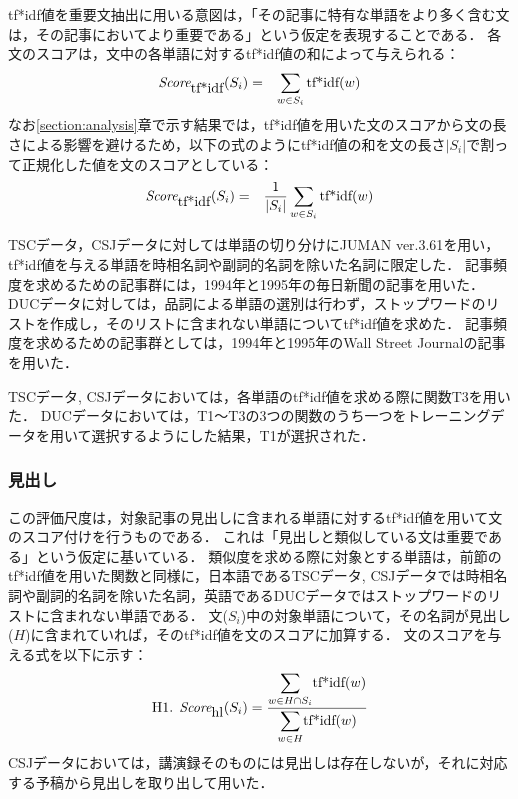tf*idf値を重要文抽出に用いる意図は，「その記事に特有な単語をより多く含む文は，その記事においてより重要である」という仮定を表現することである．
各文のスコアは，文中の各単語に対するtf*idf値の和によって与えられる：
\begin{eqnarray*}
\mbox{\it Score}_{\mbox{tf*idf}}(S_i) & = & \sum_{w \in S_i} \mbox{tf*idf}(w)
\end{eqnarray*}
なお\ref{section:analysis}章で示す結果では，tf*idf値を用いた文のスコアから文の長さによる影響を避けるため，以下の式のようにtf*idf値の和を文の長さ\(\vert S_i \vert\)で割って正規化した値を文のスコアとしている：
\begin{eqnarray*}
\mbox{\it Score}_{\mbox{tf*idf}}(S_i) & = & \frac{1}{\vert S_i \vert}\sum_{w \in S_i} \mbox{tf*idf}(w)
\end{eqnarray*}

TSCデータ，CSJデータに対しては単語の切り分けにJUMAN ver.3.61\cite{juman361}を用い，tf*idf値を与える単語を時相名詞や副詞的名詞を除いた名詞に限定した．
記事頻度を求めるための記事群には，1994年と1995年の毎日新聞の記事を用いた．
DUCデータに対しては，品詞による単語の選別は行わず，ストップワードのリストを作成し，そのリストに含まれない単語についてtf*idf値を求めた．
記事頻度を求めるための記事群としては，1994年と1995年のWall Street Journalの記事を用いた．

TSCデータ, CSJデータにおいては，各単語のtf*idf値を求める際に関数T3を用いた．
DUCデータにおいては，T1〜T3の3つの関数のうち一つをトレーニングデータを用いて選択するようにした結果，T1が選択された．

\subsubsection{見出し}

この評価尺度は，対象記事の見出しに含まれる単語に対するtf*idf値を用いて文のスコア付けを行うものである．
これは「見出しと類似している文は重要である」という仮定に基いている．
類似度を求める際に対象とする単語は，前節のtf*idf値を用いた関数と同様に，日本語であるTSCデータ, CSJデータでは時相名詞や副詞的名詞を除いた名詞，英語であるDUCデータではストップワードのリストに含まれない単語である．
文(\(S_i\))中の対象単語について，その名詞が見出し(\(H\))に含まれていれば，そのtf*idf値を文のスコアに加算する．
文のスコアを与える式を以下に示す：
\begin{eqnarray*}
\mbox{H1.  } 
\mbox{\it Score}_{\mbox{hl}}(S_i)  = 
\frac{\displaystyle{\sum_{w \in H \cap S_i}} \mbox{tf*idf}(w)}
{\displaystyle{\sum_{w \in H}} \mbox{tf*idf}(w)}
\end{eqnarray*}
CSJデータにおいては，講演録そのものには見出しは存在しないが，それに対応する予稿から見出しを取り出して用いた．

